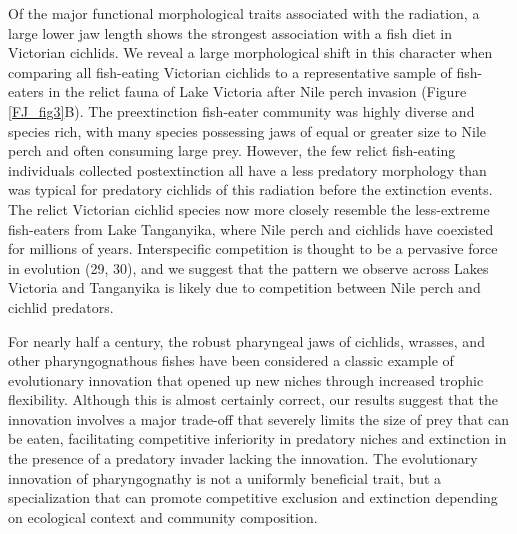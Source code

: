 Of the major functional morphological traits associated with the radiation, a large lower jaw length shows the strongest association with a fish diet in Victorian cichlids. \cite{greenwood1981haplochromine} We reveal a large morphological shift in this character when comparing all fish-eating Victorian cichlids to a representative sample of fish-eaters in the relict fauna of Lake Victoria after Nile perch invasion (Figure \ref{FJ_fig3}B). The preextinction fish-eater community was highly diverse and species rich, with many species possessing jaws of equal or greater size to Nile perch and often consuming large prey. \cite{van_oijen_ecological_1982} However, the few relict fish-eating individuals collected postextinction all have a less predatory morphology than was typical for predatory cichlids of this radiation before the extinction events. The relict Victorian cichlid species now more closely resemble the less-extreme fish-eaters from Lake Tanganyika, where Nile perch and cichlids have coexisted for millions of years. Interspecific competition is thought to be a pervasive force in evolution (29, 30), \cite{pfennig2012evolution, rabosky_diversity-dependence_2013} and we suggest that the pattern we observe across Lakes Victoria and Tanganyika is likely due to competition between Nile perch and cichlid predators.

For nearly half a century, the robust pharyngeal jaws of cichlids, wrasses, and other pharyngognathous fishes have been considered a classic example of evolutionary innovation that opened up new niches through increased trophic flexibility. \cite{liem_evolutionary_1973} Although this is almost certainly correct, our results suggest that the innovation involves a major trade-off that severely limits the size of prey that can be eaten, facilitating competitive inferiority in predatory niches and extinction in the presence of a predatory invader lacking the innovation. The evolutionary innovation of pharyngognathy is not a uniformly beneficial trait, but a specialization that can promote competitive exclusion and extinction depending on ecological context and community composition.
